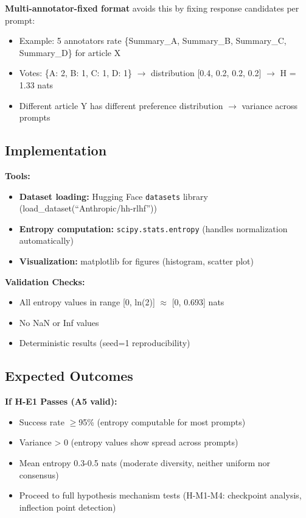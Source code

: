 \textbf{Multi-annotator-fixed format} avoids this by fixing response candidates per prompt:
\begin{itemize}
\item Example: 5 annotators rate \{Summary\_A, Summary\_B, Summary\_C, Summary\_D\} for article X
\item Votes: \{A: 2, B: 1, C: 1, D: 1\} $\rightarrow$ distribution [0.4, 0.2, 0.2, 0.2] $\rightarrow$ H = 1.33 nats
\item Different article Y has different preference distribution $\rightarrow$ variance across prompts
\end{itemize}

\subsection{Implementation}

\textbf{Tools:}
\begin{itemize}
\item \textbf{Dataset loading:} Hugging Face \texttt{datasets} library (load\_dataset(``Anthropic/hh-rlhf''))
\item \textbf{Entropy computation:} \texttt{scipy.stats.entropy} (handles normalization automatically)
\item \textbf{Visualization:} matplotlib for figures (histogram, scatter plot)
\end{itemize}

\textbf{Validation Checks:}
\begin{itemize}
\item All entropy values in range [0, ln(2)] $\approx$ [0, 0.693] nats
\item No NaN or Inf values
\item Deterministic results (seed=1 reproducibility)
\end{itemize}

\subsection{Expected Outcomes}

\textbf{If H-E1 Passes (A5 valid):}
\begin{itemize}
\item Success rate $\geq$95\% (entropy computable for most prompts)
\item Variance > 0 (entropy values show spread across prompts)
\item Mean entropy 0.3-0.5 nats (moderate diversity, neither uniform nor consensus)
\item Proceed to full hypothesis mechanism tests (H-M1-M4: checkpoint analysis, inflection point detection)
\end{itemize}

